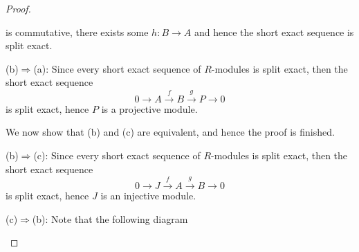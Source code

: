 \begin{proof}
\begin{center}
\end{center}
is commutative, there exists some $h:B\to A$ and hence the short exact sequence is split exact.\par
(b)$\Rightarrow$(a): Since every short exact sequence of $R$-modules is split exact, then the short exact sequence 
$$
0\longrightarrow A\overset{f}{\longrightarrow}B\overset{g}{\longrightarrow}P\longrightarrow 0
$$
is split exact, hence $P$ is a projective module.\par
We now show that (b) and (c) are equivalent, and hence the proof is finished.\par
(b)$\Rightarrow$(c): Since every short exact sequence of $R$-modules is split exact, then the short exact sequence 
$$
0\longrightarrow J\overset{f}{\longrightarrow}A\overset{g}{\longrightarrow}B\longrightarrow 0
$$
is split exact, hence $J$ is an injective module.\par
(c)$\Rightarrow$(b): Note that the following diagram 
\begin{center}



\begin{tikzpicture}[x=0.75pt,y=0.75pt,yscale=-1,xscale=1]


\end{tikzpicture}
\end{center}
\end{proof}
